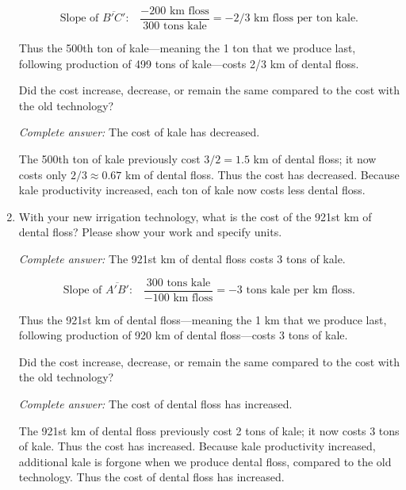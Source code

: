 \documentclass{assignment}
\begin{document}
\begin{enumerate}
\begin{solution}
$$\text{Slope of $\overline{B'C'}$:} \quad \frac{-200\text{ km floss}}{300\text{ tons kale}} = -2/3 \text{ km floss per ton kale}.$$

Thus the 500th ton of kale---meaning the 1 ton that we produce last, following production of 499 tons of kale---costs 2/3 km of dental floss.
\end{solution}

Did the cost increase, decrease, or remain the same compared to the cost with the old technology?

\begin{solution}
\emph{Complete answer:} The cost of kale has decreased.

The 500th ton of kale previously cost $3/2=1.5$ km of dental floss; it now costs only $2/3\approx0.67$ km of dental floss. Thus the cost has decreased. Because kale productivity increased, each ton of kale now costs less dental floss.
\end{solution}

\item With your new irrigation technology, what is the cost of the 921st km of dental floss? Please show your work and specify units.

\begin{solution}
\emph{Complete answer:} The 921st km of dental floss costs 3 tons of kale.

$$\text{Slope of $\overline{A'B'}$:} \quad \frac{300\text{ tons kale}}{-100\text{ km floss}} = -3 \text{ tons kale per km floss}.$$

Thus the 921st km of dental floss---meaning the 1 km that we produce last, following production of 920 km of dental floss---costs 3 tons of kale.
\end{solution}

Did the cost increase, decrease, or remain the same compared to the cost with the old technology?

\begin{solution}
\emph{Complete answer:} The cost of dental floss has increased.

The 921st km of dental floss previously cost 2 tons of kale; it now costs 3 tons of kale. Thus the cost has increased. Because kale productivity increased, additional kale is forgone when we produce dental floss, compared to the old technology. Thus the cost of dental floss has increased.
\end{solution}

\end{enumerate}
\end{document}
